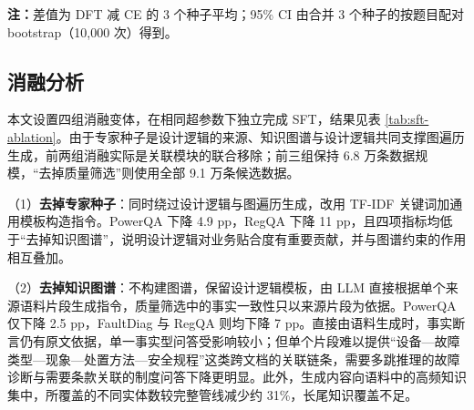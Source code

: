 \documentclass[fontset=fandol,type=master,campus=shenzhen,etitleauto=true]{hithesisbook}
\begin{document}
\begin{table}[htbp]
\centering
\caption{CPT 初始化下 CE 与 DFT 的多种子重复结果（3 个随机种子）}
\label{tab:cpt-dft-seeds}
\small
\setlength{\tabcolsep}{4pt}
\renewcommand{\arraystretch}{1.15}

\vspace{0.2cm}
\parbox{\linewidth}{\small \textbf{注：}差值为 DFT 减 CE 的 3 个种子平均；95\% CI 由合并 3 个种子的按题目配对 bootstrap（10{,}000 次）得到。}
\end{table}

\subsection{消融分析}\label{ux6d88ux878dux5206ux6790}

本文设置四组消融变体，在相同超参数下独立完成 SFT，结果见表 \ref{tab:sft-ablation}。由于专家种子是设计逻辑的来源、知识图谱与设计逻辑共同支撑图遍历生成，前两组消融实际是关联模块的联合移除；前三组保持 6.8 万条数据规模，“去掉质量筛选”则使用全部 9.1 万条候选数据。

（1）\textbf{去掉专家种子}：同时绕过设计逻辑与图遍历生成，改用 TF-IDF 关键词加通用模板构造指令。PowerQA 下降 4.9 pp，RegQA 下降 11 pp，且四项指标均低于“去掉知识图谱”，说明设计逻辑对业务贴合度有重要贡献，并与图谱约束的作用相互叠加。

（2）\textbf{去掉知识图谱}：不构建图谱，保留设计逻辑模板，由 LLM 直接根据单个来源语料片段生成指令，质量筛选中的事实一致性只以来源片段为依据。PowerQA 仅下降 2.5 pp，FaultDiag 与 RegQA 则均下降 7 pp。直接由语料生成时，事实断言仍有原文依据，单一事实型问答受影响较小；但单个片段难以提供“设备—故障类型—现象—处置方法—安全规程”这类跨文档的关联链条，需要多跳推理的故障诊断与需要条款关联的制度问答下降更明显。此外，生成内容向语料中的高频知识集中，所覆盖的不同实体数较完整管线减少约 31\%，长尾知识覆盖不足。
\end{document}
